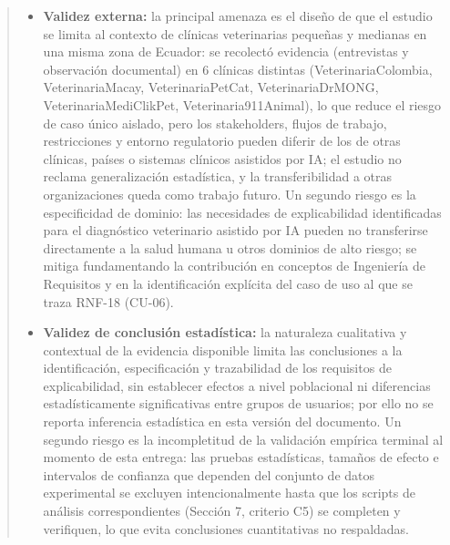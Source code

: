 \documentclass[
]{article}
\begin{document}
\begin{quote}
\begin{itemize}
  clínica y administrativa real; se mitigó complementando las
  entrevistas semiestructuradas con observación directa y evidencia
  documental del contexto organizacional, aunque dicha observación se
  realizó en la misma organización que las entrevistas, por lo que no
  constituye una réplica independiente en otra clínica veterinaria.
  \item \textbf{Validez externa:} la principal amenaza es el diseño de
  que el estudio se limita al contexto de clínicas veterinarias pequeñas y
  medianas en una misma zona de Ecuador: se recolectó evidencia (entrevistas
  y observación documental) en 6 clínicas distintas (VeterinariaColombia,
  VeterinariaMacay, VeterinariaPetCat, VeterinariaDrMONG,
  VeterinariaMediClikPet, Veterinaria911Animal), lo que reduce el riesgo de
  caso único aislado, pero los stakeholders,
  flujos de trabajo, restricciones y entorno regulatorio pueden diferir
  de los de otras clínicas, países o sistemas clínicos asistidos por
  IA; el estudio no reclama generalización estadística, y la
  transferibilidad a otras organizaciones queda como trabajo futuro. Un
  segundo riesgo es la especificidad de dominio: las necesidades de
  explicabilidad identificadas para el diagnóstico veterinario asistido
  por IA pueden no transferirse directamente a la salud humana u otros
  dominios de alto riesgo; se mitiga fundamentando la contribución en
  conceptos de Ingeniería de Requisitos y en la identificación explícita
  del caso de uso al que se traza RNF-18 (CU-06).

  \item \textbf{Validez de conclusión estadística:} la naturaleza
  cualitativa y contextual de la evidencia disponible limita las
  conclusiones a la identificación, especificación y trazabilidad de
  los requisitos de explicabilidad, sin establecer efectos a nivel
  poblacional ni diferencias estadísticamente significativas entre
  grupos de usuarios; por ello no se reporta inferencia estadística en
  esta versión del documento. Un segundo riesgo es la incompletitud de
  la validación empírica terminal al momento de esta entrega: las
  pruebas estadísticas, tamaños de efecto e intervalos de confianza que
  dependen del conjunto de datos experimental se excluyen
  intencionalmente hasta que los scripts de análisis correspondientes
  (Sección 7, criterio C5) se completen y verifiquen, lo que evita
  conclusiones cuantitativas no respaldadas.
\end{itemize}
\end{quote}
\end{document}
